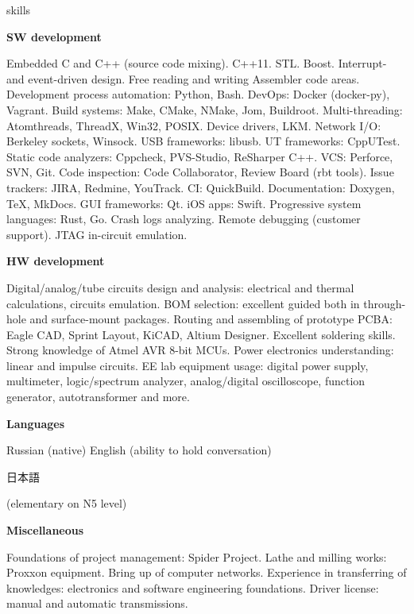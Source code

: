 \documentclass{template}
\begin{document}
\begin{rSection}{skills}
\begin{rItemize}

\item \textbf{SW development}

      Embedded C and C++ (source code mixing). C++11. STL. Boost. Interrupt- and event-driven design. Free reading and writing Assembler code
      areas. Development process automation: Python, Bash. DevOps: Docker (docker-py), Vagrant. Build systems: Make, CMake, NMake, Jom, Buildroot.
      Multi-threading: Atomthreads, ThreadX, Win32, POSIX. Device drivers, LKM. Network I/O: Berkeley sockets, Winsock. USB frameworks: libusb. UT
      frameworks: CppUTest. Static code analyzers: Cppcheck, PVS-Studio, ReSharper C++. VCS: Perforce, SVN, Git. Code inspection: Code Collaborator,
      Review Board (rbt tools). Issue trackers: JIRA, Redmine, YouTrack. CI: QuickBuild. Documentation: Doxygen, \TeX, MkDocs. GUI frameworks: Qt.
      iOS apps: Swift. Progressive system languages: Rust, Go. Crash logs analyzing. Remote debugging (customer support). JTAG in-circuit emulation.

\item \textbf{HW development}

      Digital/analog/tube circuits design and analysis: electrical and thermal calculations, circuits emulation. BOM selection: excellent guided
      both in through-hole and surface-mount packages. Routing and assembling of prototype PCBA: Eagle CAD, Sprint Layout, KiCAD,
      Altium Designer. Excellent soldering skills. Strong knowledge of Atmel AVR 8-bit MCUs. Power electronics understanding: linear and
      impulse circuits. EE lab equipment usage: digital power supply, multimeter, logic/spectrum analyzer, analog/digital oscilloscope, function
      generator, autotransformer and more.

\item \textbf{Languages}

      Russian (native) \newline
      English (ability to hold conversation) \newline
      \begin{CJK}{UTF8}{min}日本語\end{CJK} (elementary on N5 level)

\item \textbf{Miscellaneous}

      Foundations of project management: Spider Project. Lathe and milling works: Proxxon equipment. Bring up of computer networks.
      Experience in transferring of knowledges: electronics and software engineering foundations. Driver license: manual and automatic
      transmissions.

\end{rItemize}
\end{rSection}
\end{document}
